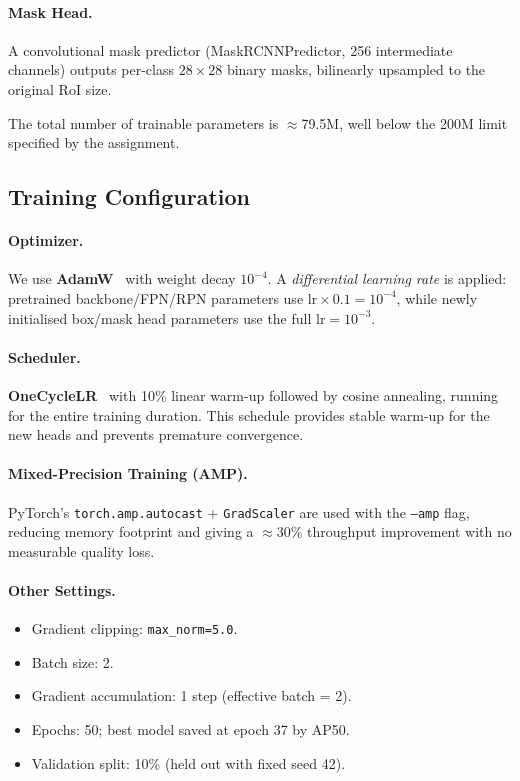 \documentclass[11pt]{article}
\begin{document}
\paragraph{Mask Head.}
A convolutional mask predictor (MaskRCNNPredictor, 256 intermediate
channels) outputs per-class $28\times28$ binary masks, bilinearly
upsampled to the original RoI size.

The total number of trainable parameters is $\approx$79.5M, well below the
200M limit specified by the assignment.

\subsection{Training Configuration}

\paragraph{Optimizer.}
We use \textbf{AdamW}~\cite{loshchilov2019decoupled} with weight decay
$10^{-4}$. A \emph{differential learning rate} is applied: pretrained
backbone/FPN/RPN parameters use $\text{lr} \times 0.1 = 10^{-4}$, while
newly initialised box/mask head parameters use the full
$\text{lr} = 10^{-3}$.

\paragraph{Scheduler.}
\textbf{OneCycleLR}~\cite{smith2019super} with 10\% linear warm-up
followed by cosine annealing, running for the entire training duration.
This schedule provides stable warm-up for the new heads and prevents
premature convergence.

\paragraph{Mixed-Precision Training (AMP).}
PyTorch's \texttt{torch.amp.autocast} + \texttt{GradScaler} are used
with the \texttt{--amp} flag, reducing memory footprint and giving a
$\approx$30\% throughput improvement with no measurable quality loss.

\paragraph{Other Settings.}
\begin{itemize}[noitemsep]
  \item Gradient clipping: \texttt{max\_norm=5.0}.
  \item Batch size: 2.
  \item Gradient accumulation: 1 step (effective batch = 2).
  \item Epochs: 50; best model saved at epoch 37 by AP50.
  \item Validation split: 10\% (held out with fixed seed 42).
\end{itemize}
\end{document}
